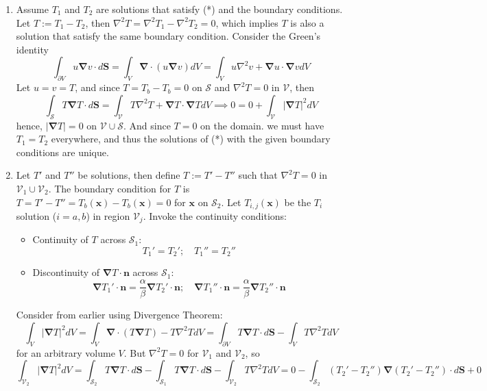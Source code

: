 \documentclass[a4paper]{article}
\begin{document}
\begin{ans}\leavevmode
\begin{enumerate}[label=(\roman*)]
\item Assume $T_1$ and $T_2$ are solutions that satisfy (*) and the boundary conditions. Let $T:=T_1-T_2$, then $\nabla^2T=\nabla^2T_1-\nabla^2T_2=0$, which implies $T$ is also a solution that satisfy the same boundary condition. Consider the Green's identity
$$\int_{\partial V}u\boldsymbol{\nabla}v\cdot d \mathbf{S}=\int_V\boldsymbol{\nabla}\cdot(u\boldsymbol{\nabla}v)dV=\int_Vu\nabla^2v+\boldsymbol{\nabla}u\cdot\boldsymbol{\nabla}vdV$$
Let $u=v=T$, and since $T=T_b-T_b=0$ on $\mathcal{S}$ and $\nabla^2T=0$ in $\mathcal{V}$, then
$$\int_{\mathcal{S}}T\boldsymbol{\nabla}T\cdot d\mathbf{S}=\int_{\mathcal{V}}T\nabla^2T+\boldsymbol{\nabla}T\cdot\boldsymbol{\nabla}TdV\implies 0=0+\int_{\mathcal{V}}|\boldsymbol{\nabla}T|^2dV$$
hence, $|\boldsymbol{\nabla}T|=0$ on $\mathcal{V}\cup\mathcal{S}$. And since $T=0$ on the domain. we must have $T_1=T_2$ everywhere, and thus the solutions of (*) with the given boundary conditions are unique.
\item Let $T'$ and $T''$ be solutions, then define $T:=T'-T''$ such that $\nabla^2T=0$ in $\mathcal{V}_1\cup\mathcal{V}_2$. The boundary condition for $T$ is $T=T'-T''=T_b(\mathbf{x})-T_b(\mathbf{x})=0$ for $\mathbf{x}$ on $\mathcal{S}_2$. Let $T_{i,j}(\mathbf{x})$ be the $T_i$ solution ($i=a,b$) in region $\mathcal{V}_j$. Invoke the continuity conditions:
\begin{itemize}
    \item Continuity of $T$ across $\mathcal{S}_1$:
    $$T_1'=T_2';\quad T_1''=T_2''$$
    \item Discontinuity of $\boldsymbol{\nabla}T\cdot\mathbf{n}$ across $\mathcal{S}_1$:
    $$\boldsymbol{\nabla}T_1'\cdot\mathbf{n}=\frac{\alpha}{\beta}\boldsymbol{\nabla}T_2'\cdot\mathbf{n};\quad \boldsymbol{\nabla}T_1''\cdot\mathbf{n}=\frac{\alpha}{\beta}\boldsymbol{\nabla}T_2''\cdot\mathbf{n}$$
\end{itemize}
Consider from earlier using Divergence Theorem:
$$\int_V|\boldsymbol{\nabla}T|^2dV=\int_V\boldsymbol{\nabla}\cdot (T\boldsymbol{\nabla}T)-T\nabla^2TdV=\int_{\partial V}T\boldsymbol{\nabla}T\cdot d\mathbf{S}-\int_VT\nabla^2TdV$$
for an arbitrary volume $V$. But $\nabla^2T=0$ for $\mathcal{V}_1$ and $\mathcal{V}_2$, so
$$\int_{\mathcal{V}_2}|\boldsymbol{\nabla}T|^2dV=\int_{\mathcal{S}_2}T\boldsymbol{\nabla}T\cdot d\mathbf{S}-\int_{\mathcal{S}_1}T\boldsymbol{\nabla}T\cdot d\mathbf{S}-\int_{\mathcal{V}_2}T\nabla^2TdV=0-\int_{\mathcal{S}_2}(T_2'-T_2'')\boldsymbol{\nabla}(T_2'-T_2'')\cdot d\mathbf{S}+0$$

\end{enumerate}
\end{ans}
\end{document}
